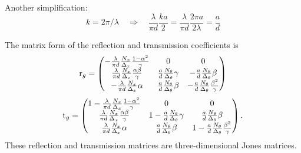 Another simplification:
\begin{equation}
    k = 2\pi / \lambda
    \quad \Rightarrow \quad
    \frac{\lambda}{\pi d} \frac{ka}{2}
    =
    \frac{\lambda}{\pi d} \frac{2\pi a}{2\lambda}
    =
    \frac{a}{d}
\end{equation}

The matrix form of the reflection and transmission coefficients is
\begin{equation}
    \mathrm{r}_g =
    \begin{pmatrix}
        -\frac{\lambda}{\pi d}
        \frac{N_x}{\Delta_x}
        \frac{1 - \alpha^2}{\gamma}
        &
        0
        &
        0
        \\
        \frac{\lambda}{\pi d}
        \frac{N_x}{\Delta_x}
        \frac{\alpha \beta}{\gamma}
        &
        \frac{a}{d}
        \frac{N_\theta}{\Delta_\theta}
        \gamma
        &
        -
        \frac{a}{d}
        \frac{N_\theta}{\Delta_\theta}
        \beta
        \\
        -
        \frac{\lambda}{\pi d}
        \frac{N_x}{\Delta_x}
        \alpha
        &
        \frac{a}{d}
        \frac{N_\theta}{\Delta_\theta}
        \beta
        &
        -
        \frac{a}{d}
        \frac{N_\theta}{\Delta_\theta}
        \frac{\beta^2}{\gamma}
    \end{pmatrix}
    \label{eq:grid_rg}
\end{equation}
\begin{equation}
    \mathrm{t}_g =
    \begin{pmatrix}
        1 -
        \frac{\lambda}{\pi d}
        \frac{N_x}{\Delta_x}
        \frac{1 - \alpha^2}{\gamma}
        &
        0
        &
        0
        \\
        \frac{\lambda}{\pi d}
        \frac{N_x}{\Delta_x}
        \frac{\alpha \beta}{\gamma}
        &
        1 -
        \frac{a}{d}
        \frac{N_\theta}{\Delta_\theta}
        \gamma
        &
        \frac{a}{d}
        \frac{N_\theta}{\Delta_\theta}
        \beta
        \\
        \frac{\lambda}{\pi d}
        \frac{N_x}{\Delta_x}
        \alpha
        &
        \frac{a}{d}
        \frac{N_\theta}{\Delta_\theta}
        \beta
        &
        1 -
        \frac{a}{d}
        \frac{N_\theta}{\Delta_\theta}
        \frac{\beta^2}{\gamma}
    \end{pmatrix}
    \text{.}
    \label{eq:grid_tg}
\end{equation}
These reflection and transmission matrices are three-dimensional Jones matrices.

